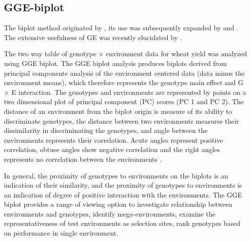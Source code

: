 \subsection{GGE-biplot}
The biplot method originated by \citep{GABRIEL1971}, its use was subsequently expanded by \citep{Kempton1984} and \citep{Zobel1988}. The extensive usefulness of GE was recently elucidated by \citep{Yan2000}. 

The two way table of genotype $\times$ environment data for wheat yield was analyzed using GGE biplot. The GGE biplot analysis produces biplots derived from principal components analysis of the environment centered data (data minus the environment means), which therefore represents the genotype main effect and G $\times$ E interaction. The genotypes and environments are represented by points on a two dimensional plot of principal component (PC) scores (PC 1 and PC 2). The distance of an environment from the biplot origin is measure of its ability to discriminate genotypes, the distance between two environments measures their dissimilarity in discriminating the genotypes, and angle between the environments represents their correlation. Acute angles represent positive correlation, obtuse angles show negative correlation and the right angles represents no correlation between the environments \citep{Yan2005}.

 In general, the proximity of genotypes to environments on the biplots is an indication of their similarity, and the proximity of genotypes to environments is an indication of degree of positive interaction with the environments. The GGE biplot provides a range of viewing option to investigate relationship between environments and genotypes, identify mega-environments, examine the representativeness of test environments as selection sites, rank genotypes based on performance in 
 single environment. 

